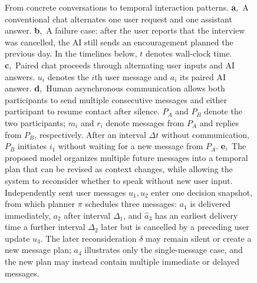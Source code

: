 \documentclass[manuscript,nonacm]{acmart}
\begin{document}
\begin{figure}[t]
  \centering
  \resizebox{0.98\textwidth}{!}{}
  \caption{From concrete conversations to temporal interaction patterns.
  \textbf{a},~A conventional chat alternates one user request and one assistant answer.
  \textbf{b},~A failure case: after the user reports that the interview was cancelled,
  the AI still sends an encouragement planned the previous day. In the timelines
  below, $t$ denotes wall-clock time.
  \textbf{c},~Paired chat proceeds through alternating user inputs and AI answers.
  $u_i$ denotes the $i$th user message and $a_i$ its paired AI answer.
  \textbf{d},~Human asynchronous communication allows both participants to send
  multiple consecutive messages and either participant to resume contact after
  silence. $P_A$ and $P_B$ denote the two participants; $m_i$ and $r_i$ denote
  messages from $P_A$ and replies from $P_B$, respectively. After an interval
  $\Delta t$ without communication, $P_B$ initiates $i_1$ without waiting for a
  new message from $P_A$.
  \textbf{e},~The proposed model organizes multiple future messages into a temporal
  plan that can be revised as context changes, while allowing the system to
  reconsider whether to speak without new user input. Independently sent user
  messages $u_1,u_2$ enter one decision snapshot, from which planner $\pi$ schedules
  three messages: $a_1$ is delivered immediately, $a_2$ after interval $\Delta_1$,
  and $\widehat{a}_3$ has an earliest delivery time a further interval $\Delta_2$
  later but is cancelled by a preceding user update $u_3$. The later
  reconsideration $\delta$ may remain silent or create a new message plan;
  $a_4$ illustrates only the single-message case, and the new plan may instead
  contain multiple immediate or delayed messages.}
  \label{fig:timeline}
\end{figure}
\end{document}
